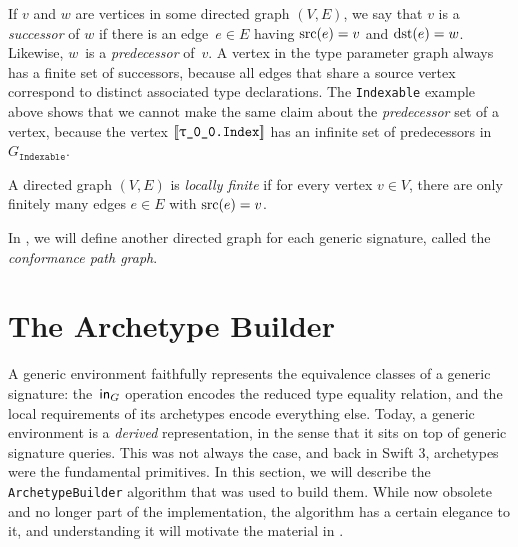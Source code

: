 \documentclass[../generics]{subfiles}
\begin{document}
If $v$ and $w$ are vertices in some directed graph $(V, E)$, we say that $v$ is a \emph{successor} of $w$ if there is an edge~$e\in E$ having $\operatorname{src}(e)=v$ and $\operatorname{dst}(e)=w$. Likewise, $w$~is a \emph{predecessor} of~$v$. A vertex in the type parameter graph always has a finite set of successors, because all edges that share a source vertex correspond to distinct associated type declarations. The \texttt{Indexable} example above shows that we cannot make the same claim about the \emph{predecessor} set of a vertex, because the vertex $\archetype{\rT.Index}$ has an infinite set of predecessors in $G_\texttt{Indexable}$.

\begin{definition}\label{locally finite def}
A directed graph $(V,E)$ is \emph{locally finite} if for every vertex $v\in V$, there are only finitely many edges $e\in E$ with $\operatorname{src}(e)=v$.
\end{definition}

In , we will define another directed graph for each generic signature, called the \emph{conformance path graph}.

\section{The Archetype Builder}\label{archetype builder}

A generic environment faithfully represents the equivalence classes of a generic signature: the~$\mathsf{in}_G$ operation encodes the reduced type equality relation, and the local requirements of its archetypes encode everything else. Today, a generic environment is a \emph{derived} representation, in the sense that it sits on top of generic signature queries. This was not always the case, and back in Swift 3, archetypes were the fundamental primitives. In this section, we will describe the \texttt{ArchetypeBuilder} algorithm that was used to build them. While now obsolete and no longer part of the implementation, the algorithm has a certain elegance to it, and understanding it will motivate the material in .
\end{document}

